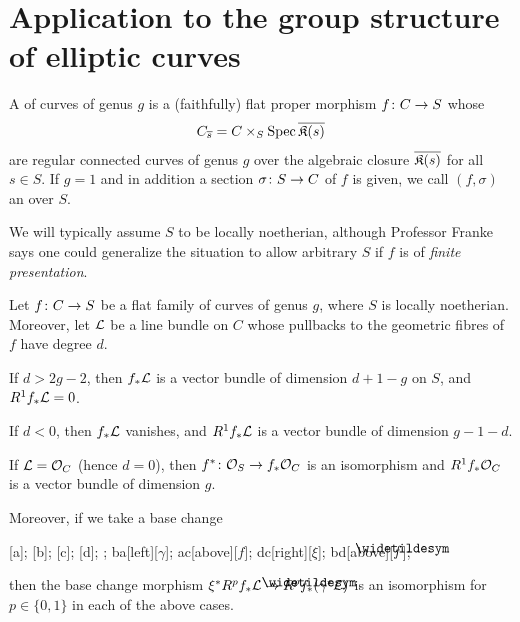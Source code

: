 \documentclass[a4paper,parskip=half,numbers=enddot, DIV=12]{scrreprt}
\begin{document}
\section{Application to the group structure of elliptic curves}
\begin{defi}
	A  of curves of genus $g$ is a (faithfully) flat proper morphism $f\colon C\morphism S$ whose 
	\begin{align*}
		C_{\overline{s}}=C\times_S\operatorname{Spec}\overline{\mathfrak{K}(s)}
	\end{align*}
	are regular connected curves of genus $g$ over the algebraic closure $\overline{\mathfrak{K}(s)}$ for all $s\in S$. If $g=1$ and in addition a section  $\sigma\colon S\morphism C$  of $f$ is given, we call $(f,\sigma)$ an  over $S$.
\end{defi}
We will typically assume $S$ to be locally noetherian, although Professor Franke says one could generalize the situation to allow arbitrary $S$ if $f$ is of \emph{finite presentation}.
\begin{prop}
	Let $f\colon C\morphism S$ be a flat family of curves of genus $g$, where $S$ is locally noetherian. Moreover, let $\mathcal{L}$ be a line bundle on $C$ whose pullbacks to the geometric fibres of $f$ have degree $d$.
	\begin{alphanumerate}
		\item If $d>2g-2$, then $f_*\mathcal{L}$ is a vector bundle of dimension $d+1-g$ on $S$, and $R^1f_*\mathcal{L}=0$.
		\item If $d<0$, then $f_*\mathcal{L}$ vanishes, and $R^1f_*\mathcal{L}$ is a vector bundle of dimension $g-1-d$.
		\item If $\mathcal{L}=\mathcal{O}_C$ (hence $d=0$), then $f^*\colon \Oo_S\morphism f_*\Oo_C$ is an isomorphism and $R^1f_*\mathcal{O}_C$ is a vector bundle of dimension $g$.
	\end{alphanumerate}
	Moreover, if we take a base change
	\begin{diagram*}
		[a];
		[b];
		[c];
		[d];
		;
		\scriptsize
		\arrow ba[left][$\gamma$];
		\arrow ac[above][$f$];
		\arrow dc[right][$\xi$];
		\arrow bd[above][$\snake{f}$];
	\end{diagram*}
	then the base change morphism $\xi^*R^pf_*\Ll\morphism R^p\snake{f}_*(\gamma^*\Ll)$ is an isomorphism for $p\in\{0,1\}$ in each of the above cases.
\end{prop}
\end{document}

